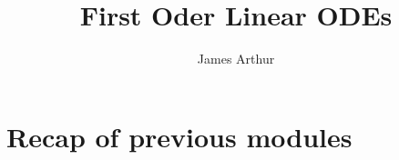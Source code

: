 \documentclass{article}
\title{First Oder Linear ODEs}
\author{James Arthur}
\begin{document}
\maketitle
\tableofcontents\newpage



\section{Recap of previous modules}
\end{document}
